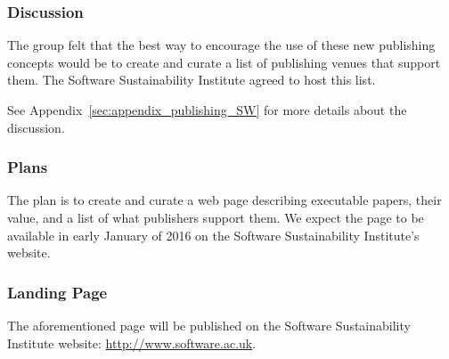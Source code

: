 \subsubsection{Discussion}

The group felt that the best way to encourage the use of these new publishing
concepts would be to create and curate a list of publishing venues that
support them. The Software Sustainability Institute agreed to host this list.

See Appendix~\ref{sec:appendix_publishing_SW} for more details about the
discussion.

\subsubsection{Plans}

The plan is to create and curate a web page describing executable papers, their value, and
a list of what publishers support them. We expect the page to be available in
early January of 2016 on the Software Sustainability Institute's website.

\subsubsection{Landing Page}

The aforementioned page will be published on the Software Sustainability
Institute website: \url{http://www.software.ac.uk}.

